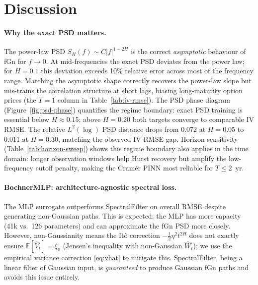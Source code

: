 \documentclass[11pt,a4paper]{article}
\newcommand{\E}{\mathbb{E}}
\begin{document}
\section{Discussion}
\label{sec:discussion}

\paragraph{Why the exact PSD matters.}
The power-law PSD $S_H(f) \sim C|f|^{1-2H}$ is the correct
\emph{asymptotic} behaviour of fGn for $f \to 0$. At mid-frequencies
the exact PSD deviates from the power law; for $H = 0.1$ this deviation
exceeds 10\% relative error across most of the frequency range.
Matching the asymptotic shape correctly recovers the power-law slope but
mis-trains the correlation structure at short lags, biasing long-maturity
option prices (the $T = 1$ column in Table~\ref{tab:iv-rmse}).
The PSD phase diagram (Figure~\ref{fig:psd-phase}) quantifies the
regime boundary: exact PSD training is essential below $H\approx 0.15$;
above $H=0.20$ both targets converge to comparable IV RMSE. The
relative $L^2(\log)$ PSD distance drops from $0.072$ at $H=0.05$
to $0.011$ at $H=0.30$, matching the observed IV RMSE gap.
Horizon sensitivity (Table~\ref{tab:horizon-sweep}) shows this regime
boundary also applies in the time domain: longer observation windows
help Hurst recovery but amplify the low-frequency cutoff penalty,
making the Cramér PINN most reliable for $T \leq 2$~yr.

\paragraph{BochnerMLP: architecture-agnostic spectral loss.}
The MLP surrogate outperforms SpectralFilter on overall RMSE despite
generating non-Gaussian paths. This is expected: the MLP has more
capacity (41k vs.\ 126 parameters) and can approximate the fGn PSD more
closely. However, non-Gaussianity means the Itô correction
$-\frac{1}{2}\eta^2 t^{2H}$ does not exactly ensure $\E[\hat{V}_t] =
\xi_0$ (Jensen's inequality with non-Gaussian $\hat{W}_t$); we use the
empirical variance correction \eqref{eq:vhat} to mitigate this.
SpectralFilter, being a linear filter of Gaussian input, is
\emph{guaranteed} to produce Gaussian fGn paths and avoids this issue
entirely.
\end{document}
